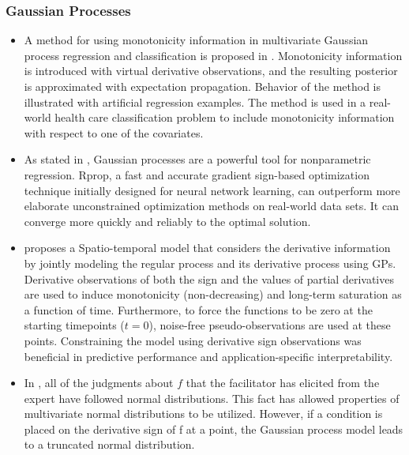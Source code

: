 \documentclass[11pt]{book}
\begin{document}
\subsubsection{Gaussian Processes}
\begin{itemize}
\item A method for using monotonicity information in multivariate Gaussian
process regression and classification is proposed in \cite{riihimaki2010gaussian}.
Monotonicity information is introduced with virtual derivative observations,
and the resulting posterior is approximated with expectation propagation.
Behavior of the method is illustrated with artificial regression examples.
The method is used in a real-world health care classification problem
to include monotonicity information with respect to one of the covariates.
\item As stated in \cite{blum2013optimization},
Gaussian processes are a powerful tool for nonparametric regression.
Rprop, a fast and accurate gradient sign-based optimization technique
initially designed for neural network learning, can outperform more
elaborate unconstrained optimization methods on real-world data sets.
It can converge more quickly and reliably to the optimal solution.
\item \cite{riutort2019gaussian}
proposes a Spatio-temporal model that considers the derivative information
by jointly modeling the regular process and its derivative process
using GPs. Derivative observations of both the sign and the values
of partial derivatives are used to induce monotonicity (non-decreasing)
and long-term saturation as a function of time. Furthermore, to force
the functions to be zero at the starting timepoints ($t=0$), noise-free
pseudo-observations are used at these points. Constraining the model
using derivative sign observations was beneficial in predictive performance
and application-specific interpretability.
\item In \cite{riutort2020correlated},
all of the judgments about $f$ that the facilitator has elicited
from the expert have followed normal distributions. This fact has
allowed properties of multivariate normal distributions to be utilized.
However, if a condition is placed on the derivative sign of f at a
point, the Gaussian process model leads to a truncated normal distribution.
\end{itemize}

\end{document}
